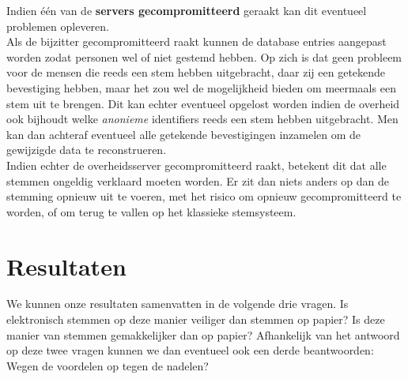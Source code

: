 \documentclass[a4paper,12pt]{article}
\begin{document}
Indien \'e\'en van de \textbf{servers gecompromitteerd} geraakt kan dit
eventueel problemen opleveren. \\ Als de bijzitter gecompromitteerd raakt
kunnen de database entries aangepast worden zodat personen wel of niet gestemd
hebben. Op zich is dat geen probleem voor de mensen die reeds een stem hebben
uitgebracht, daar zij een getekende bevestiging hebben, maar het zou wel de
mogelijkheid bieden om meermaals een stem uit te brengen. Dit kan echter
eventueel opgelost worden indien de overheid ook bijhoudt welke \emph{anonieme}
identifiers reeds een stem hebben uitgebracht. Men kan dan achteraf eventueel
alle getekende bevestigingen inzamelen om de gewijzigde data te reconstrueren.
\\ Indien echter de overheidsserver gecompromitteerd raakt, betekent dit dat
alle stemmen ongeldig verklaard moeten worden. Er zit dan niets anders op dan de
stemming opnieuw uit te voeren, met het risico om opnieuw gecompromitteerd te
worden, of om terug te vallen op het klassieke stemsysteem.

\section{Resultaten}

We kunnen onze resultaten samenvatten in de volgende drie vragen. Is
elektronisch stemmen op deze manier veiliger dan stemmen op papier?  Is deze
manier van stemmen gemakkelijker dan op papier? Afhankelijk van het antwoord op
deze twee vragen kunnen we dan eventueel ook een derde beantwoorden: Wegen de
voordelen op tegen de nadelen?
\end{document}
